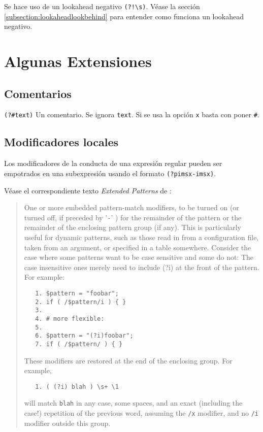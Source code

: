 Se hace uso de un lookahead negativo \verb|(?!\s)|.
Véase la sección \ref{subsection:lookaheadlookbehind} para entender como funciona
un lookahead negativo.

\section{Algunas Extensiones}

\subsection{Comentarios}
\verb|(?#text)| Un comentario. Se ignora \verb|text|. 
Si se usa la opción \verb|x| basta con poner \verb|#|.

\subsection{Modificadores locales}

Los modificadores de la conducta de una expresión regular pueden ser 
empotrados en una subexpresión usando el formato \verb|(?pimsx-imsx)|.

Véase el correspondiente texto {\it Extended Patterns} de 
:
\begin{it}
\begin{quotation}
One or more embedded pattern-match modifiers, to be turned on (or turned
off, if preceded by '\verb|-|' ) for the remainder of the pattern or the remainder
of the enclosing pattern group (if any). This is particularly useful
for dynamic patterns, such as those read in from a configuration file,
taken from an argument, or specified in a table somewhere. Consider
the case where some patterns want to be case sensitive and some do not:
The case insensitive ones merely need to include (?i) at the front of
the pattern. For example:

\begin{verbatim}
   1. $pattern = "foobar";
   2. if ( /$pattern/i ) { }
   3.
   4. # more flexible:
   5.
   6. $pattern = "(?i)foobar";
   7. if ( /$pattern/ ) { }
\end{verbatim}

These modifiers are restored at the end of the enclosing group. For example,

\begin{verbatim}
   1. ( (?i) blah ) \s+ \1
\end{verbatim}

will match \verb|blah| in any case, some spaces, and an exact (including the
case!) repetition of the previous word, assuming the \verb|/x| modifier, and
no \verb|/i| modifier outside this group.
\end{quotation}
\end{it}

